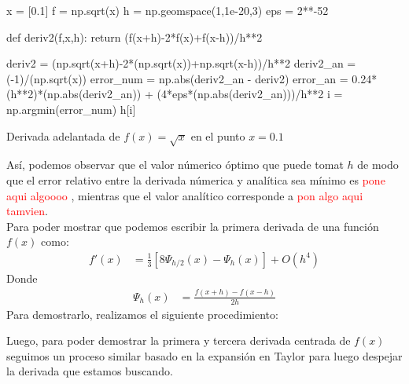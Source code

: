 \documentclass[../portafolio.tex]{subfiles}
\begin{document}
	\begin{listing}
		\begin{pythoncode}
x = [0.1]
f = np.sqrt(x)
h = np.geomspace(1,1e-20,3)
eps = 2**-52

def deriv2(f,x,h):
    return (f(x+h)-2*f(x)+f(x-h))/h**2 

deriv2 = (np.sqrt(x+h)-2*(np.sqrt(x))+np.sqrt(x-h))/h**2
deriv2_an = (-1)/(np.sqrt(x))
error_num = np.abs(deriv2_an - deriv2)
error_an = 0.24*(h**2)*(np.abs(deriv2_an)) + (4*eps*(np.abs(deriv2_an)))/h**2
i = np.argmin(error_num)
h[i]		
		\end{pythoncode}
		\caption{Derivada adelantada de $f(x)= \sqrt{x}$ en el punto $x=0.1$}
		\label{cod:deriv2}
	\end{listing}
As\'i, podemos observar que el valor n\'umerico \'optimo que puede tomat $h$ de modo que el error relativo entre la derivada n\'umerica y anal\'itica sea m\'inimo es \textcolor{red}{pone aqui algoooo} , mientras que el valor anal\'itico corresponde a \textcolor{red}{pon algo aqui tamvien}. \\

Para poder mostrar que podemos escribir la primera derivada de una funci\'on $f(x)$ como:
	\begin{align}
		f'(x) &= \frac{1}{3} \left[8 \Psi_{h/2}(x) - \Psi_h (x) \right] + O(h^4)
	\end{align}
Donde
	\begin{align}
		\Psi_h(x) &= \frac{f(x+h)-f(x-h)}{2h} 
	\end{align}
Para demostrarlo, realizamos el siguiente procedimiento:

Luego, para poder demostrar la primera y tercera derivada centrada de $f(x)$ seguimos un proceso similar basado en la expansi\'on en Taylor para luego despejar la derivada que estamos buscando.
\end{document}
